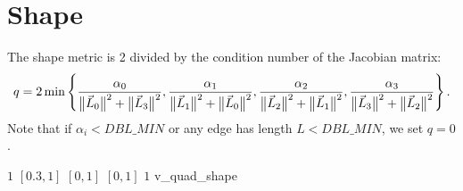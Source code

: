 \section{Shape\label{s:quad-shape}}

The shape metric is 2 divided by the condition number of the Jacobian matrix:
\[
q =
  2 \min \left\{ \frac {\alpha_0} { \big\lVert{\vec L_0}\big\rVert^2 + \big\lVert{\vec L_3}\big\rVert^2 }, 
                 \frac {\alpha_1} { \big\lVert{\vec L_1}\big\rVert^2 + \big\lVert{\vec L_0}\big\rVert^2 }, 
                 \frac {\alpha_2} { \big\lVert{\vec L_2}\big\rVert^2 + \big\lVert{\vec L_1}\big\rVert^2 }, 
                 \frac {\alpha_3} { \big\lVert{\vec L_3}\big\rVert^2 + \big\lVert{\vec L_2}\big\rVert^2 }
  \right\}.
\]
Note that if $\alpha_i < DBL\_MIN$ or any edge has length $L < DBL\_MIN$, we set $q = 0$.

%
{$1$}%
{$[0.3,1]$}%
{$[0,1]$}%
{$[0,1]$}%
{$1$}%
{\cite{knu:03}}%
{v\_quad\_shape}%


